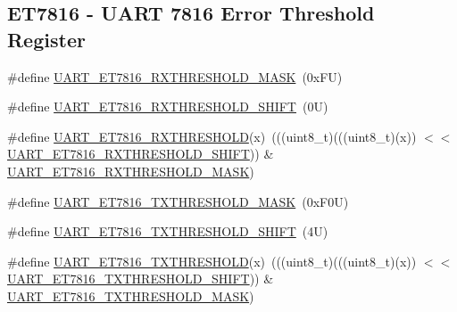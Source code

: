 \subsection*{E\+T7816 -\/ U\+A\+RT 7816 Error Threshold Register}
\begin{DoxyCompactItemize}
\item 
\#define \mbox{\hyperlink{group___u_a_r_t___register___masks_ga9ef739359fd7d60427900938502e5100}{U\+A\+R\+T\+\_\+\+E\+T7816\+\_\+\+R\+X\+T\+H\+R\+E\+S\+H\+O\+L\+D\+\_\+\+M\+A\+SK}}~(0x\+F\+U)
\item 
\#define \mbox{\hyperlink{group___u_a_r_t___register___masks_gacd8498adcff369769fb56dde33ce7465}{U\+A\+R\+T\+\_\+\+E\+T7816\+\_\+\+R\+X\+T\+H\+R\+E\+S\+H\+O\+L\+D\+\_\+\+S\+H\+I\+FT}}~(0\+U)
\item 
\#define \mbox{\hyperlink{group___u_a_r_t___register___masks_ga497482306b260f45732d82ac5503aba4}{U\+A\+R\+T\+\_\+\+E\+T7816\+\_\+\+R\+X\+T\+H\+R\+E\+S\+H\+O\+LD}}(x)~(((uint8\+\_\+t)(((uint8\+\_\+t)(x)) $<$$<$ \mbox{\hyperlink{group___u_a_r_t___register___masks_gacd8498adcff369769fb56dde33ce7465}{U\+A\+R\+T\+\_\+\+E\+T7816\+\_\+\+R\+X\+T\+H\+R\+E\+S\+H\+O\+L\+D\+\_\+\+S\+H\+I\+FT}})) \& \mbox{\hyperlink{group___u_a_r_t___register___masks_ga9ef739359fd7d60427900938502e5100}{U\+A\+R\+T\+\_\+\+E\+T7816\+\_\+\+R\+X\+T\+H\+R\+E\+S\+H\+O\+L\+D\+\_\+\+M\+A\+SK}})
\item 
\#define \mbox{\hyperlink{group___u_a_r_t___register___masks_ga6c3c5365dc3ba6ac54a4bd4330ff60cf}{U\+A\+R\+T\+\_\+\+E\+T7816\+\_\+\+T\+X\+T\+H\+R\+E\+S\+H\+O\+L\+D\+\_\+\+M\+A\+SK}}~(0x\+F0\+U)
\item 
\#define \mbox{\hyperlink{group___u_a_r_t___register___masks_ga427963f9e067b0856aa8830cae622291}{U\+A\+R\+T\+\_\+\+E\+T7816\+\_\+\+T\+X\+T\+H\+R\+E\+S\+H\+O\+L\+D\+\_\+\+S\+H\+I\+FT}}~(4\+U)
\item 
\#define \mbox{\hyperlink{group___u_a_r_t___register___masks_ga0f26cca6a1f58b4b08ff7b471d66881d}{U\+A\+R\+T\+\_\+\+E\+T7816\+\_\+\+T\+X\+T\+H\+R\+E\+S\+H\+O\+LD}}(x)~(((uint8\+\_\+t)(((uint8\+\_\+t)(x)) $<$$<$ \mbox{\hyperlink{group___u_a_r_t___register___masks_ga427963f9e067b0856aa8830cae622291}{U\+A\+R\+T\+\_\+\+E\+T7816\+\_\+\+T\+X\+T\+H\+R\+E\+S\+H\+O\+L\+D\+\_\+\+S\+H\+I\+FT}})) \& \mbox{\hyperlink{group___u_a_r_t___register___masks_ga6c3c5365dc3ba6ac54a4bd4330ff60cf}{U\+A\+R\+T\+\_\+\+E\+T7816\+\_\+\+T\+X\+T\+H\+R\+E\+S\+H\+O\+L\+D\+\_\+\+M\+A\+SK}})
\end{DoxyCompactItemize}
